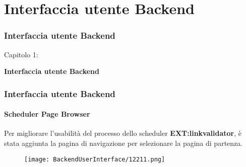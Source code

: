 %

\section{Interfaccia utente Backend}
\begin{frame}[fragile]
	\frametitle{Interfaccia utente Backend}

	\begin{center}\huge{Capitolo 1:}\end{center}
	\begin{center}\huge{\color{typo3darkgrey}\textbf{Interfaccia utente Backend}}\end{center}

\end{frame}

\begin{frame}[fragile]
	\frametitle{Interfaccia utente Backend}
	\framesubtitle{Scheduler Page Browser}

	Per migliorare l'usabilità del processo dello scheduler \textbf{EXT:linkvalidator},
	è stata aggiunta la pagina di navigazione per selezionare la pagina di partenza.

	\begin{figure}\vspace{-0.2cm}
		\texttt{[image: BackendUserInterface/12211.png]}
	\end{figure}

\end{frame}

